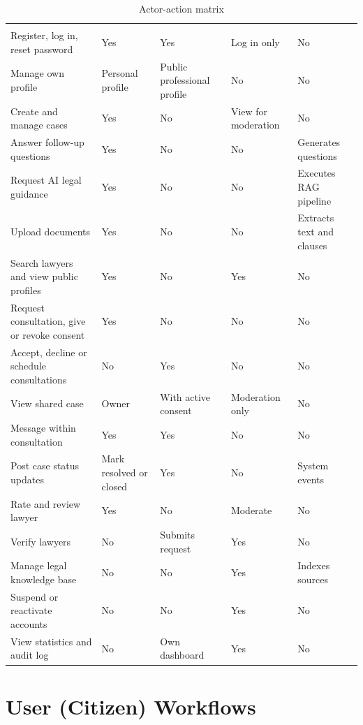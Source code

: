 \begin{longtable}{|L{6.68cm}|L{1.70cm}|L{1.60cm}|L{1.70cm}|L{1.87cm}|}
\caption{Actor-action matrix}\label{tab:1.2}\\
\hline\headrow {} &  &  &  &  \\ \hline
\endfirsthead
\hline\headrow {} &  &  &  &  \\ \hline
\endhead
\hline\endlastfoot
Register, log in, reset password & Yes & Yes & Log in only & No \\ \hline
Manage own profile & Personal profile & Public professional profile & No & No \\ \hline
Create and manage cases & Yes & No & View for moderation & No \\ \hline
Answer follow-up questions & Yes & No & No & Generates questions \\ \hline
Request AI legal guidance & Yes & No & No & Executes RAG pipeline \\ \hline
Upload documents & Yes & No & No & Extracts text and clauses \\ \hline
Search lawyers and view public profiles & Yes & No & Yes & No \\ \hline
Request consultation, give or revoke consent & Yes & No & No & No \\ \hline
Accept, decline or schedule consultations & No & Yes & No & No \\ \hline
View shared case & Owner & With active consent & Moderation only & No \\ \hline
Message within consultation & Yes & Yes & No & No \\ \hline
Post case status updates & Mark resolved or closed & Yes & No & System events \\ \hline
Rate and review lawyer & Yes & No & Moderate & No \\ \hline
Verify lawyers & No & Submits request & Yes & No \\ \hline
Manage legal knowledge base & No & No & Yes & Indexes sources \\ \hline
Suspend or reactivate accounts & No & No & Yes & No \\ \hline
View statistics and audit log & No & Own dashboard & Yes & No \\
\end{longtable}

\chapter{User (Citizen) Workflows}\label{ch:2}

